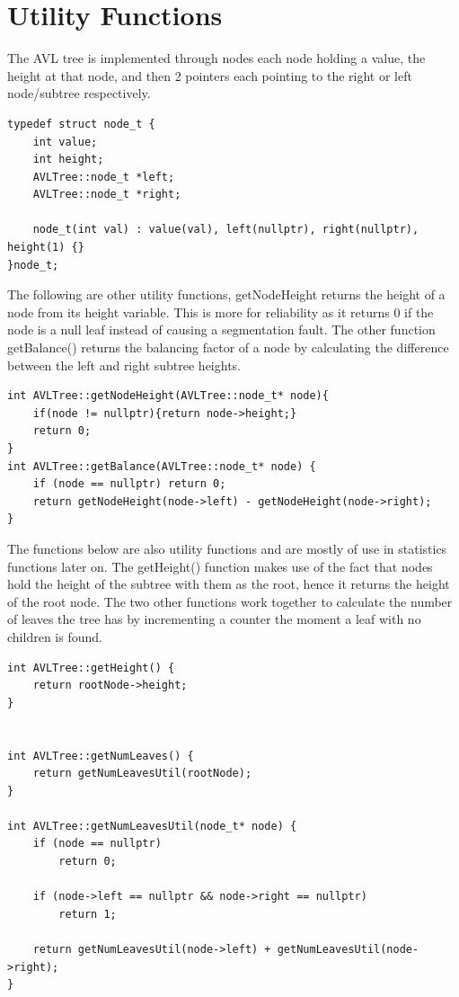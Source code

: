 \documentclass[12pt, a4paper]{report}
\begin{document}
\section{Utility Functions}

The AVL tree is implemented through nodes each node holding a value, the height at that node, and then 2 pointers each pointing to the right or left node/subtree respectively.

\begin{verbatim}
typedef struct node_t {
    int value;    
    int height; 
    AVLTree::node_t *left;  
    AVLTree::node_t *right;

    node_t(int val) : value(val), left(nullptr), right(nullptr), height(1) {}
}node_t;
\end{verbatim}
The following are other utility functions, getNodeHeight returns the height of a node from its height variable. This is more for reliability as it returns 0 if the node is a null leaf instead of causing a segmentation fault. The other function getBalance() returns the balancing factor of a node by calculating the difference between the left and right subtree heights.
\begin{verbatim}
int AVLTree::getNodeHeight(AVLTree::node_t* node){
    if(node != nullptr){return node->height;}
    return 0;
}
int AVLTree::getBalance(AVLTree::node_t* node) {
    if (node == nullptr) return 0;
    return getNodeHeight(node->left) - getNodeHeight(node->right);
}
\end{verbatim}

The functions below are also utility functions and are mostly of use in statistics functions later on. The getHeight() function makes use of the fact that nodes hold the height of the subtree with them as the root, hence it returns the height of the root node. The two other functions work together to calculate the number of leaves the tree has by incrementing a counter the moment a leaf with no children is found.

\begin{verbatim}
int AVLTree::getHeight() {
    return rootNode->height;
}


int AVLTree::getNumLeaves() {
    return getNumLeavesUtil(rootNode);
}

int AVLTree::getNumLeavesUtil(node_t* node) {
    if (node == nullptr)
        return 0;
    
    if (node->left == nullptr && node->right == nullptr)
        return 1;
    
    return getNumLeavesUtil(node->left) + getNumLeavesUtil(node->right);
}
\end{verbatim}
\end{document}
